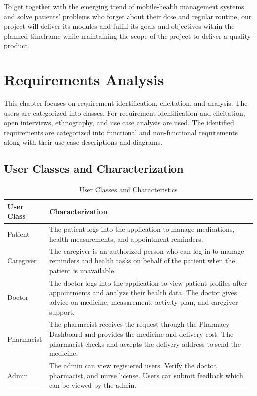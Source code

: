 \documentclass[12pt, a4paper, oneside]{report}
\begin{document}
To get together with the emerging trend of mobile-health management systems and solve patients' problems who forget about their dose and regular routine, our project will deliver its modules and fulfill its goals and objectives within the planned timeframe while maintaining the scope of the project to deliver a quality product.

\chapter{Requirements Analysis}
\label{ch:analysis}

This chapter focuses on requirement identification, elicitation, and analysis. The users are categorized into classes. For requirement identification and elicitation, open interviews, ethnography, and use case analysis are used. The identified requirements are categorized into functional and non-functional requirements along with their use case descriptions and diagrams.

\section{User Classes and Characterization}
\label{sec:user-classes}

\begin{table}[H]
\centering
\caption{User Classes and Characteristics}
\label{tab:user-classes}
\begin{tabularx}{\textwidth}{|l|X|}
\hline
\textbf{User Class} & \textbf{Characterization} \\ \hline
Patient & The patient logs into the application to manage medications, health measurements, and appointment reminders. \\ \hline
Caregiver & The caregiver is an authorized person who can log in to manage reminders and health tasks on behalf of the patient when the patient is unavailable. \\ \hline
Doctor & The doctor logs into the application to view patient profiles after appointments and analyze their health data. The doctor gives advice on medicine, measurement, activity plan, and caregiver support. \\ \hline
Pharmacist & The pharmacist receives the request through the Pharmacy Dashboard and provides the medicine and delivery cost. The pharmacist checks and accepts the delivery address to send the medicine. \\ \hline
Admin & The admin can view registered users. Verify the doctor, pharmacist, and nurse license. Users can submit feedback which can be viewed by the admin. \\ \hline
\end{tabularx}
\end{table}
\end{document}
